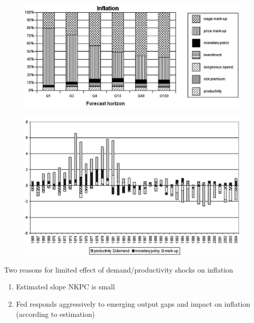 \documentclass{beamer}
\begin{document}
\begin{frame}
  \begin{figure}
    \includegraphics[scale=.8]{sw_figure1_inflation.eps}
  \end{figure}
\end{frame}

\begin{frame}
  \begin{figure}
    \includegraphics[scale=.8]{sw_figure4_inflation.eps}
  \end{figure}
\end{frame}

\begin{frame}
  Two reasons for limited effect of demand/productivity shocks on inflation
  \begin{enumerate}
    \item Estimated slope NKPC is small
    \item Fed responds aggressively to emerging output gaps and impact on inflation (according to estimation)
  \end{enumerate}
\end{frame}
\end{document}
